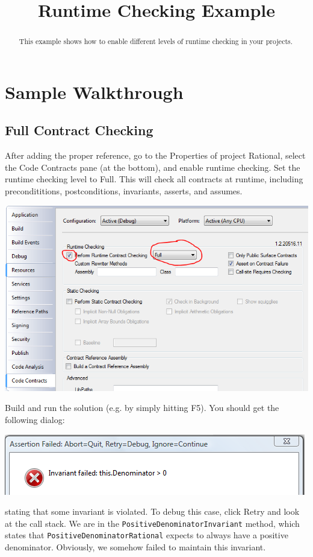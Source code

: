 \documentclass{article}
\title{\ProjectName{} Runtime Checking Example}
\date{}
\newcommand{\ProjectName}{Rational}
\newcommand{\code}[1]{\lstinline{#1}}
\begin{document}
\maketitle
\begin{abstract}
This example shows how to enable different levels of runtime checking
in your projects.
\end{abstract}



\section{Sample Walkthrough}
\label{sec:start}

\subsection{Full Contract Checking}
After adding the proper reference, go to the Properties of project
\textsf{\ProjectName}, select the Code Contracts pane (at the bottom),
and enable runtime checking. Set the runtime checking level to
\textsf{Full}. This will check all contracts at runtime, including
precondititions, postconditions, invariants, asserts, and assumes.
\begin{center}
  \includegraphics[width=.8\columnwidth]{ex1.png}
\end{center}
Build and run the solution (e.g. by simply hitting F5). You should get
the following dialog:
\begin{center}
  \includegraphics[width=.8\columnwidth]{ex2.png}
\end{center}
stating that some invariant is violated. To debug this case, click
\textsf{Retry} and look at the call stack. We are in the
\code{PositiveDenominatorInvariant} method, which states that
\code{PositiveDenominatorRational} expects to always have a positive
denominator. Obviously, we somehow failed to maintain this invariant.
\end{document}
